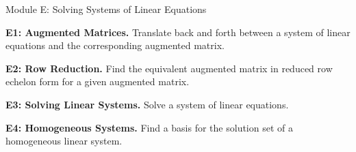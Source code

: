 
\begin{module}{Module E: Solving Systems of Linear Equations}

\begin{moduleStandards}
  \item \textbf{E1: Augmented Matrices.}
        Translate back and forth between a system of linear equations and
        the corresponding augmented matrix.
  \item \textbf{E2: Row Reduction.}
        Find the equivalent augmented matrix in reduced row echelon form
        for a given augmented matrix.
  \item \textbf{E3: Solving Linear Systems.}
        Solve a system of linear equations.
  \item \textbf{E4: Homogeneous Systems.}
        Find a basis for the solution set of a homogeneous linear system.
\end{moduleStandards}







\end{module}
